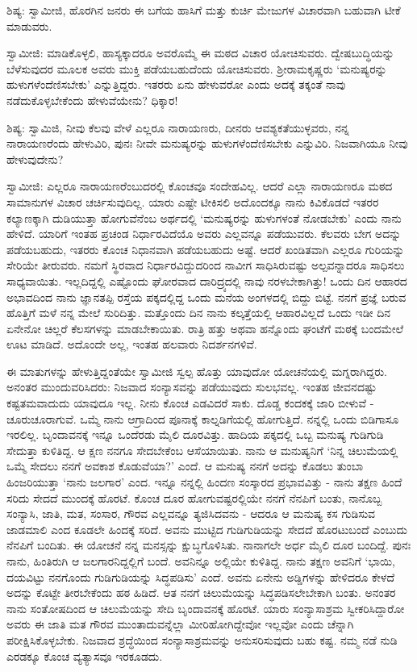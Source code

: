 ಶಿಷ್ಯ: ಸ್ವಾಮೀಜಿ, ಹೊರಗಿನ ಜನರು ಈ ಬಗೆಯ ಹಾಸಿಗೆ ಮತ್ತು ಕುರ್ಚಿ ಮೇಜುಗಳ ವಿಚಾರವಾಗಿ ಬಹುವಾಗಿ ಟೀಕೆ ಮಾಡುವರು.

ಸ್ವಾಮೀಜಿ: ಮಾಡಿಕೊಳ್ಳಲಿ, ಹಾಸ್ಯಕ್ಕಾದರೂ ಅವರೊಮ್ಮೆ ಈ ಮಠದ ವಿಚಾರ ಯೋಚಿಸುವರು. ದ್ವೇಷಬುದ್ಧಿಯನ್ನು ಬೆಳೆಸುವುದರ ಮೂಲಕ ಅವರು ಮುಕ್ತಿ ಪಡೆಯಬಹುದೆಂದು ಯೋಚಿಸುವರು. ಶ‍್ರೀರಾಮಕೃಷ್ಣರು ‘ಮನುಷ್ಯರನ್ನು ಹುಳುಗಳೆಂದೆಣಿಸಬೇಕು’ ಎನ್ನುತ್ತಿದ್ದರು. ಇತರರು ಏನು ಹೇಳುವರೋ ಎಂದು ಅದಕ್ಕೆ ತಕ್ಕಂತೆ ನಾವು ನಡೆದುಕೊಳ್ಳಬೇಕೆಂದು ಹೇಳುವೆಯೇನು? ಧಿಕ್ಕಾರ!

ಶಿಷ್ಯ: ಸ್ವಾಮಿಜಿ, ನೀವು ಕೆಲವು ವೇಳೆ ಎಲ್ಲರೂ ನಾರಾಯಣರು, ದೀನರು ಆವಶ್ಯಕತೆಯುಳ್ಳವರು, ನನ್ನ ನಾರಾಯಣರೆಂದು ಹೇಳುವಿರಿ, ಪುನಃ ನೀವೇ ಮನುಷ್ಯರನ್ನು ಹುಳುಗಳೆಂದೆಣಿಸಬೇಕು ಎನ್ನುವಿರಿ. ನಿಜವಾಗಿಯೂ ನೀವು ಹೇಳುವುದೇನು?

ಸ್ವಾಮೀಜಿ: ಎಲ್ಲರೂ ನಾರಾಯಣರೆಂಬುದರಲ್ಲಿ ಕೊಂಚವೂ ಸಂದೇಹವಿಲ್ಲ. ಆದರೆ ಎಲ್ಲಾ ನಾರಾಯಣರೂ ಮಠದ ಸಾಮಾನುಗಳ ವಿಚಾರ ಚರ್ಚಿಸುವುದಿಲ್ಲ. ಯಾರು ಎಷ್ಟೇ ಟೀಕಿಸಲಿ ಅದೊಂದಕ್ಕೂ ನಾನು ಕಿವಿಕೊಡದೆ ಇತರರ ಕಲ್ಯಾಣಕ್ಕಾಗಿ ದುಡಿಯುತ್ತಾ ಹೋಗುವೆನೆಂಬ ಅರ್ಥದಲ್ಲಿ ‘ಮನುಷ್ಯರನ್ನು ಹುಳುಗಳಂತೆ ನೋಡಬೇಕು’ ಎಂದು ನಾನು ಹೇಳಿದೆ. ಯಾರಿಗೆ ಇಂತಹ ಪ್ರಚಂಡ ನಿರ್ಧಾರವಿದೆಯೊ ಅವರು ಎಲ್ಲವನ್ನೂ ಪಡೆಯುವರು. ಕೆಲವರು ಬೇಗ ಅದನ್ನು ಪಡೆಯಬಹುದು, ಇತರರು ಕೊಂಚ ನಿಧಾನವಾಗಿ ಪಡೆಯಬಹುದು ಅಷ್ಟೆ. ಆದರೆ ಖಂಡಿತವಾಗಿ ಎಲ್ಲರೂ ಗುರಿಯನ್ನು ಸೇರಿಯೇ ತೀರುವರು. ನಮಗೆ ಸ್ಥಿರವಾದ ನಿರ್ಧಾರವಿದ್ದುದರಿಂದ ನಾವೀಗ ಸಾಧಿಸಿರುವಷ್ಟು ಅಲ್ಪವನ್ನಾದರೂ ಸಾಧಿಸಲು ಸಾಧ್ಯವಾಯಿತು. ಇಲ್ಲದಿದ್ದಲ್ಲಿ ಎಷ್ಟೊಂದು ಘೋರವಾದ ದಾರಿದ್ರ್ಯದಲ್ಲಿ ನಾವು ನರಳಬೇಕಾಗಿತ್ತು! ಒಂದು ದಿನ ಆಹಾರದ ಅಭಾವದಿಂದ ನಾನು ಜ್ಞಾನತಪ್ಪಿ ರಸ್ತೆಯ ಪಕ್ಕದಲ್ಲಿದ್ದ ಒಂದು ಮನೆಯ ಅಂಗಳದಲ್ಲಿ ಬಿದ್ದು ಬಿಟ್ಟೆ. ನನಗೆ ಪ್ರಜ್ಞೆ ಬರುವ ಹೊತ್ತಿಗೆ ಮಳೆ ನನ್ನ ಮೇಲೆ ಸುರಿದಿತ್ತು. ಮತ್ತೊಂದು ದಿನ ನಾನು ಕಲ್ಕತ್ತೆಯಲ್ಲಿ ಆಹಾರವಿಲ್ಲದೆ ಒಂದು ಇಡೀ ದಿನ ಏನೇನೋ ಚಿಲ್ಲರೆ ಕೆಲಸಗಳನ್ನು ಮಾಡಬೇಕಾಯಿತು. ರಾತ್ರಿ ಹತ್ತು ಅಥವಾ ಹನ್ನೊಂದು ಘಂಟೆಗೆ ಮಠಕ್ಕೆ ಬಂದಮೇಲೆ ಊಟ ಮಾಡಿದೆ. ಅದೊಂದೇ ಅಲ್ಲ, ಇಂತಹ ಹಲವಾರು ನಿದರ್ಶನಗಳಿವೆ.

ಈ ಮಾತುಗಳನ್ನು ಹೇಳುತ್ತಿದ್ದಂತೆಯೇ ಸ್ವಾಮೀಜಿ ಸ್ವಲ್ಪ ಹೊತ್ತು ಯಾವುದೋ ಯೋಚನೆಯಲ್ಲಿ ಮಗ್ನರಾಗಿದ್ದರು. ಅನಂತರ ಮುಂದುವರಿಸಿದರು: ನಿಜವಾದ ಸಂನ್ಯಾಸವನ್ನು ಪಡೆಯುವುದು ಸುಲಭವಲ್ಲ. ಇಂತಹ ಜೀವನದಷ್ಟು ಕಷ್ಟತಮವಾದುದು ಯಾವುದೂ ಇಲ್ಲ. ನೀನು ಕೊಂಚ ಎಡವಿದರೆ ಸಾಕು. ದೊಡ್ಡ ಕಂದಕಕ್ಕೆ ಜಾರಿ ಬೀಳುವೆ - ಚೂರುಚೂರಾಗುವೆ. ಒಮ್ಮೆ ನಾನು ಆಗ್ರಾದಿಂದ ಪೂನಾಕ್ಕೆ ಕಾಲ್ನಡಿಗೆಯಲ್ಲಿ ಹೋಗುತ್ತಿದೆ. ನನ್ನಲ್ಲಿ ಒಂದು ಬಿಡಿಗಾಸೂ ಇರಲಿಲ್ಲ. ಬೃಂದಾವನಕ್ಕೆ ಇನ್ನೂ ಒಂದೆರಡು ಮೈಲಿ ದೂರವಿತ್ತು. ಹಾದಿಯ ಪಕ್ಕದಲ್ಲಿ ಒಬ್ಬ ಮನುಷ್ಯ ಗುಡಿಗುಡಿ ಸೇದುತ್ತಾ ಕುಳಿತಿದ್ದ. ಆ ಕ್ಷಣ ನನಗೂ ಸೇದಬೇಕೆಂಬ ಆಸೆಯಾಯಿತು. ನಾನು ಆ ಮನುಷ್ಯನಿಗೆ ‘ನಿನ್ನ ಚಿಲುಮೆಯಲ್ಲಿ ಒಮ್ಮೆ ಸೇದಲು ನನಗೆ ಅವಕಾಶ ಕೊಡುವೆಯಾ?’ ಎಂದೆ. ಆ ಮನುಷ್ಯ ನನಗೆ ಅದನ್ನು ಕೊಡಲು ತುಂಬಾ ಹಿಂಜರಿಯುತ್ತಾ ‘ನಾನು ಜಲಗಾರ’ ಎಂದ. ಇನ್ನೂ ನನ್ನಲ್ಲಿ ಹಿಂದಣ ಸಂಸ್ಕಾರದ ಪ್ರಭಾವವಿತ್ತು - ನಾನು ತಕ್ಷಣ ಹಿಂದೆ ಸರಿದು ಸೇದದೆ ಮುಂದಕ್ಕೆ ಹೊರಟೆ. ಕೊಂಚ ದೂರ ಹೋಗುವಷ್ಟರಲ್ಲಿಯೇ ನನಗೆ ನೆನಪಿಗೆ ಬಂತು, ನಾನೊಬ್ಬ ಸಂನ್ಯಾಸಿ, ಜಾತಿ, ಮತ, ಸಂಸಾರ, ಗೌರವ ಎಲ್ಲವನ್ನೂ ತ್ಯಜಿಸಿದವನು - ಆದರೂ ಆ ಮನುಷ್ಯ ಕಸ ಗುಡಿಸುವ ಜಾಡಮಾಲಿ ಎಂದ ಕೂಡಲೇ ಹಿಂದಕ್ಕೆ ಸರಿದೆ. ಅವನು ಮುಟ್ಟಿದ ಗುಡಿಗುಡಿಯನ್ನು ಸೇದದೆ ಹೊರಟುಬಂದೆ ಎಂಬುದು ನೆನಪಿಗೆ ಬಂದಿತು. ಈ ಯೋಚನೆ ನನ್ನ ಮನಸ್ಸನ್ನು ಕ್ಷುಬ್ಧಗೊಳಿಸಿತು. ನಾನಾಗಲೇ ಅರ್ಧ ಮೈಲಿ ದೂರ ಬಂದಿದ್ದೆ. ಪುನಃ ನಾನು, ಹಿಂತಿರುಗಿ ಆ ಜಲಗಾರನಿದ್ದಲ್ಲಿಗೆ ಬಂದೆ. ಅವನಿನ್ನೂ ಅಲ್ಲಿಯೇ ಕುಳಿತಿದ್ದ. ನಾನು ತಕ್ಷಣ ಅವನಿಗೆ ‘ಭಾಯಿ, ದಯವಿಟ್ಟು ನನಗೊಂದು ಗುಡಿಗುಡಿಯನ್ನು ಸಿದ್ಧಪಡಿಸು’ ಎಂದೆ. ಅವನು ಏನೇನು ಅಡ್ಡಿಗಳನ್ನು ಹೇಳಿದರೂ ಕೇಳದೆ ಅದನ್ನು ಕೊಟ್ಟೇ ತೀರಬೇಕೆಂದು ಹಠ ಹಿಡಿದೆ. ಆತ ನನಗೆ ಚಿಲುಮೆಯನ್ನು ಸಿದ್ಧಪಡಿಸಲೇಬೇಕಾಗಿ ಬಂತು. ಅನಂತರ ನಾನು ಸಂತೋಷದಿಂದ ಆ ಚಿಲುಮೆಯನ್ನು ಸೇದಿ ಬೃಂದಾವನಕ್ಕೆ ಹೊರಟೆ. ಯಾರು ಸಂನ್ಯಾಸಾಶ್ರಮ ಸ್ವೀಕರಿಸಿದ್ದಾರೋ ಅವರು ಈ ಜಾತಿ ಮತ ಗೌರವ ಮುಂತಾದುವನ್ನೆಲ್ಲಾ ಮೀರಿಹೋಗಿದ್ದೇವೋ ಇಲ್ಲವೋ ಎಂದು ಚೆನ್ನಾಗಿ ಪರೀಕ್ಷಿಸಿಕೊಳ್ಳಬೇಕು. ನಿಜವಾದ ಶ್ರದ್ಧೆಯಿಂದ ಸಂನ್ಯಾಸಾಶ್ರಮವನ್ನು ಅನುಸರಿಸುವುದು ಬಹು ಕಷ್ಟ. ನಮ್ಮ ನಡೆ ನುಡಿ ಎರಡಕ್ಕೂ ಕೊಂಚ ವ್ಯತ್ಯಾಸವೂ ಇರಕೂಡದು.

